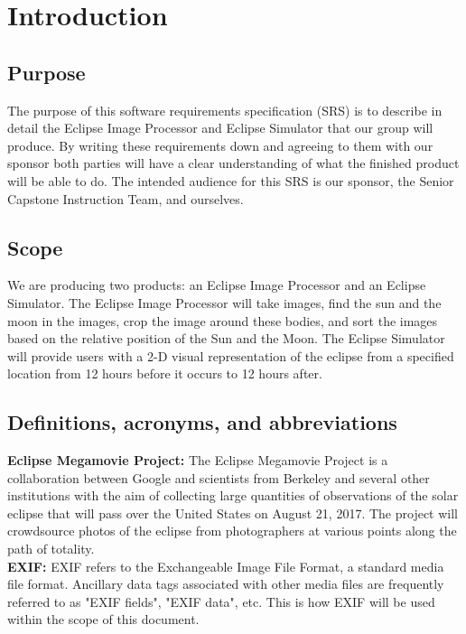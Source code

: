 \documentclass[10pt, onecolumn, draftclsnofoot, letterpaper, compsoc]{IEEEtran}
\begin{document}
\section{Introduction}

\subsection{Purpose}
The purpose of this software requirements specification (SRS) is to describe in
detail the Eclipse Image Processor and Eclipse Simulator that our group will 
produce. By writing these requirements down and agreeing to them with our 
sponsor both parties will have a clear understanding of what the finished 
product will be able to do. The intended audience for this SRS is our sponsor, 
the Senior Capstone Instruction Team, and ourselves.

\subsection{Scope}
We are producing two products: an Eclipse Image Processor and an Eclipse 
Simulator. The Eclipse Image Processor will take images, find the sun and the
moon in the images, crop the image around these bodies, and sort the images 
based on the relative position of the Sun and the Moon. The Eclipse Simulator 
will provide users with a 2-D visual representation of the eclipse from a 
specified location from 12 hours before it occurs to 12 hours after.

\subsection{Definitions, acronyms, and abbreviations}
	
	\textbf{Eclipse Megamovie Project:}
	The Eclipse Megamovie Project is a collaboration between Google 
	and scientists from Berkeley and several other institutions with the 
	aim of collecting large quantities of observations of the solar eclipse
	that will pass over the United States on August 21, 2017. The project
	will crowdsource photos of the eclipse from photographers at various 
	points along the path of totality. \\

	\noindent \textbf{EXIF:}
	EXIF refers to the Exchangeable Image File Format, a standard 
	media file format. Ancillary data tags associated with other media 
	files are frequently referred to as "EXIF fields", "EXIF data", etc.
	This is how EXIF will be used within the scope of this document. \\
\end{document}
